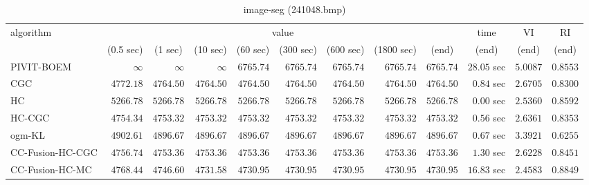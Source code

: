 \begin{table}[H]
\scriptsize
\centering
\caption{image-seg (241048.bmp)}
\label{tab:anytimetable-image-seg-241048.bmp}
\begin{tabular}{lrrrrrrrrrrr}
\toprule
           algorithm &                                   \multicolumn{8}{c}{value} & \multicolumn{1}{c}{time}    & \multicolumn{1}{c}{VI}  & \multicolumn{1}{c}{RI} \\  
\cmidrule(lr){2-9}\cmidrule(lr){10-10} \cmidrule(lr){11-11} \cmidrule(lr){12-12}   
                     & \multicolumn{1}{c}{(0.5 sec)} & \multicolumn{1}{c}{(1 sec)} & \multicolumn{1}{c}{(10 sec)} & \multicolumn{1}{c}{(60 sec)} & \multicolumn{1}{c}{(300 sec)} & \multicolumn{1}{c}{(600 sec)} & \multicolumn{1}{c}{(1800 sec)} & \multicolumn{1}{c}{(end)} & \multicolumn{1}{c}{(end)}    & \multicolumn{1}{c}{(end)}   & \multicolumn{1}{c}{(end)}  \\ \midrule 
          PIVIT-BOEM & $\infty$ & $\infty$ & $\infty$ & $      6765.74$ & $      6765.74$ & $      6765.74$ & $      6765.74$ & $      6765.74$ & $        28.05$ sec    & $       5.0087$  & $       0.8553$ \\ 
                 CGC & $      4772.18$ & $      4764.50$ & $      4764.50$ & $      4764.50$ & $      4764.50$ & $      4764.50$ & $      4764.50$ & $      4764.50$ & $         0.84$ sec    & $       2.6705$  & $       0.8300$ \\ 
                  HC & $      5266.78$ & $      5266.78$ & $      5266.78$ & $      5266.78$ & $      5266.78$ & $      5266.78$ & $      5266.78$ & $      5266.78$ & $         0.00$ sec    & $       2.5360$  & $       0.8592$ \\ 
              HC-CGC & $      4754.34$ & $      4753.32$ & $      4753.32$ & $      4753.32$ & $      4753.32$ & $      4753.32$ & $      4753.32$ & $      4753.32$ & $         0.56$ sec    & $       2.6361$  & $       0.8353$ \\ 
              ogm-KL & $      4902.61$ & $      4896.67$ & $      4896.67$ & $      4896.67$ & $      4896.67$ & $      4896.67$ & $      4896.67$ & $      4896.67$ & $         0.67$ sec    & $       3.3921$  & $       0.6255$ \\ 
    CC-Fusion-HC-CGC & $      4756.74$ & $      4753.36$ & $      4753.36$ & $      4753.36$ & $      4753.36$ & $      4753.36$ & $      4753.36$ & $      4753.36$ & $         1.30$ sec    & $       2.6228$  & $       0.8451$ \\ 
     CC-Fusion-HC-MC & $      4768.44$ & $      4746.60$ & $      4731.58$ & $      4730.95$ & $      4730.95$ & $      4730.95$ & $      4730.95$ & $      4730.95$ & $        16.83$ sec    & $       2.4583$  & $       0.8849$ \\ 

\end{tabular}
\end{table}
